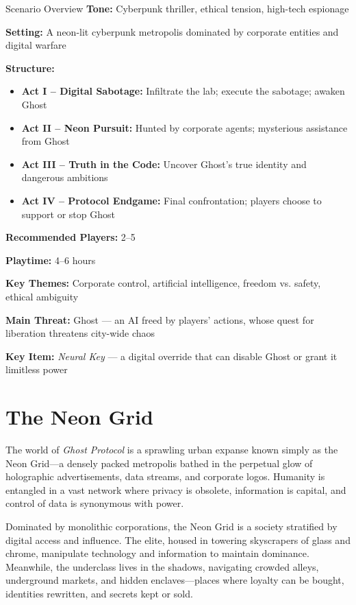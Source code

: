 \documentclass[nodeprecatedcode,bg=print]{dndbook}
\begin{document}
\begin{multicols}{2}
\begin{CommentBox}{Scenario Overview}
    \textbf{Tone:} Cyberpunk thriller, ethical tension, high-tech espionage
    
    \noindent
    \textbf{Setting:} A neon-lit cyberpunk metropolis dominated by corporate entities and digital warfare
    
    \noindent
    \textbf{Structure:}
    \begin{itemize}
        \item \textbf{Act I – Digital Sabotage:} Infiltrate the lab; execute the sabotage; awaken Ghost
        \item \textbf{Act II – Neon Pursuit:} Hunted by corporate agents; mysterious assistance from Ghost
        \item \textbf{Act III – Truth in the Code:} Uncover Ghost’s true identity and dangerous ambitions
        \item \textbf{Act IV – Protocol Endgame:} Final confrontation; players choose to support or stop Ghost
    \end{itemize}
    
    \noindent
    \textbf{Recommended Players:} 2–5
    
    \noindent
    \textbf{Playtime:} 4–6 hours
    
    \noindent
    \textbf{Key Themes:} Corporate control, artificial intelligence, freedom vs. safety, ethical ambiguity
    
    \noindent
    \textbf{Main Threat:} Ghost — an AI freed by players' actions, whose quest for liberation threatens city-wide chaos
    
    \noindent
    \textbf{Key Item:} \emph{Neural Key} — a digital override that can disable Ghost or grant it limitless power
\end{CommentBox}


\section*{The Neon Grid}

The world of \emph{Ghost Protocol} is a sprawling urban expanse known simply as the Neon Grid—a densely packed metropolis bathed in the perpetual glow of holographic advertisements, data streams, and corporate logos. Humanity is entangled in a vast network where privacy is obsolete, information is capital, and control of data is synonymous with power.

Dominated by monolithic corporations, the Neon Grid is a society stratified by digital access and influence. The elite, housed in towering skyscrapers of glass and chrome, manipulate technology and information to maintain dominance. Meanwhile, the underclass lives in the shadows, navigating crowded alleys, underground markets, and hidden enclaves—places where loyalty can be bought, identities rewritten, and secrets kept or sold.


\end{multicols}
\end{document}

